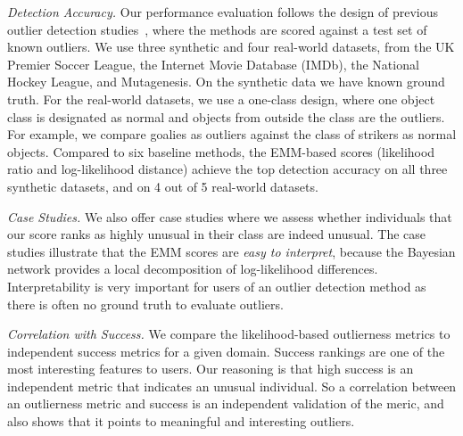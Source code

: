 {{\em Detection Accuracy.} Our performance evaluation follows the design of previous outlier detection studies~\citep{Gao2010,aggarwal2013},
where the methods are scored against a test set of known outliers.  
%
We use three synthetic and four real-world datasets, from the UK Premier Soccer League, the Internet Movie Database (IMDb), the National Hockey League, and Mutagenesis. On the synthetic data we have known ground truth. For the real-world datasets, we use a one-class design, where one object class is designated as normal and objects from outside the class are the outliers. For example, we compare goalies as outliers against the class of strikers as normal objects. 
Compared to six baseline methods, the EMM-based scores (likelihood ratio and log-likelihood distance) achieve the top detection accuracy on all three synthetic datasets, and on 4 out of 5 real-world datasets.

{\em Case Studies.} We also offer case studies where we assess whether individuals that our score ranks as highly unusual in their class are  indeed unusual. 
The case studies illustrate that the EMM scores are {\em easy to interpret}, because the Bayesian network provides a local decomposition of log-likelihood differences. Interpretability is very important for users of an outlier detection method as there is often no ground truth to 
evaluate outliers.%

{\em Correlation with Success.} We compare the likelihood-based outlierness metrics to independent success metrics for a given domain. Success rankings are one of the most interesting features to users. Our reasoning is that high success is an independent metric that indicates an unusual individual. So a correlation between an outlierness metric and success is an independent validation of the meric, and also shows that it points to meaningful and interesting outliers.

}
